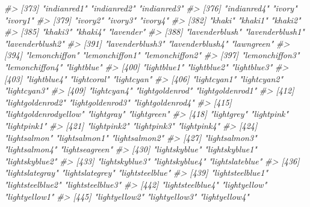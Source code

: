 \documentclass[
]{book}
\newenvironment{Shaded}{\begin{snugshade}}{\end{snugshade}}
\newcommand{\CommentTok}[1]{\textcolor[rgb]{0.56,0.35,0.01}{\textit{#1}}}
\begin{document}
\begin{Shaded}
\begin{Highlighting}[]
\CommentTok{\#\textgreater{} [373] "indianred1"           "indianred2"           "indianred3"          }
\CommentTok{\#\textgreater{} [376] "indianred4"           "ivory"                "ivory1"              }
\CommentTok{\#\textgreater{} [379] "ivory2"               "ivory3"               "ivory4"              }
\CommentTok{\#\textgreater{} [382] "khaki"                "khaki1"               "khaki2"              }
\CommentTok{\#\textgreater{} [385] "khaki3"               "khaki4"               "lavender"            }
\CommentTok{\#\textgreater{} [388] "lavenderblush"        "lavenderblush1"       "lavenderblush2"      }
\CommentTok{\#\textgreater{} [391] "lavenderblush3"       "lavenderblush4"       "lawngreen"           }
\CommentTok{\#\textgreater{} [394] "lemonchiffon"         "lemonchiffon1"        "lemonchiffon2"       }
\CommentTok{\#\textgreater{} [397] "lemonchiffon3"        "lemonchiffon4"        "lightblue"           }
\CommentTok{\#\textgreater{} [400] "lightblue1"           "lightblue2"           "lightblue3"          }
\CommentTok{\#\textgreater{} [403] "lightblue4"           "lightcoral"           "lightcyan"           }
\CommentTok{\#\textgreater{} [406] "lightcyan1"           "lightcyan2"           "lightcyan3"          }
\CommentTok{\#\textgreater{} [409] "lightcyan4"           "lightgoldenrod"       "lightgoldenrod1"     }
\CommentTok{\#\textgreater{} [412] "lightgoldenrod2"      "lightgoldenrod3"      "lightgoldenrod4"     }
\CommentTok{\#\textgreater{} [415] "lightgoldenrodyellow" "lightgray"            "lightgreen"          }
\CommentTok{\#\textgreater{} [418] "lightgrey"            "lightpink"            "lightpink1"          }
\CommentTok{\#\textgreater{} [421] "lightpink2"           "lightpink3"           "lightpink4"          }
\CommentTok{\#\textgreater{} [424] "lightsalmon"          "lightsalmon1"         "lightsalmon2"        }
\CommentTok{\#\textgreater{} [427] "lightsalmon3"         "lightsalmon4"         "lightseagreen"       }
\CommentTok{\#\textgreater{} [430] "lightskyblue"         "lightskyblue1"        "lightskyblue2"       }
\CommentTok{\#\textgreater{} [433] "lightskyblue3"        "lightskyblue4"        "lightslateblue"      }
\CommentTok{\#\textgreater{} [436] "lightslategray"       "lightslategrey"       "lightsteelblue"      }
\CommentTok{\#\textgreater{} [439] "lightsteelblue1"      "lightsteelblue2"      "lightsteelblue3"     }
\CommentTok{\#\textgreater{} [442] "lightsteelblue4"      "lightyellow"          "lightyellow1"        }
\CommentTok{\#\textgreater{} [445] "lightyellow2"         "lightyellow3"         "lightyellow4"        }

\end{Highlighting}
\end{Shaded}
\end{document}

